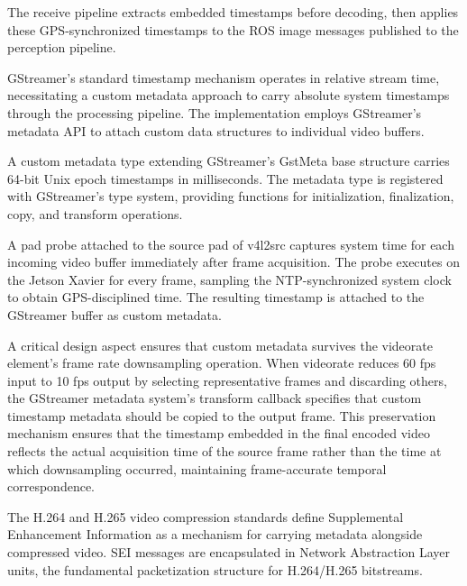 \documentclass{erauthesis}
\begin{document}
The receive pipeline extracts embedded timestamps before decoding, then applies these GPS-synchronized timestamps to the ROS image messages published to the perception pipeline.


GStreamer's standard timestamp mechanism operates in relative stream time, necessitating a custom metadata approach to carry absolute system timestamps through the processing pipeline.
The implementation employs GStreamer's metadata API to attach custom data structures to individual video buffers.

A custom metadata type extending GStreamer's GstMeta base structure carries 64-bit Unix epoch timestamps in milliseconds.
The metadata type is registered with GStreamer's type system, providing functions for initialization, finalization, copy, and transform operations.


A pad probe attached to the source pad of v4l2src captures system time for each incoming video buffer immediately after frame acquisition.
The probe executes on the Jetson Xavier for every frame, sampling the NTP-synchronized system clock to obtain GPS-disciplined time.
The resulting timestamp is attached to the GStreamer buffer as custom metadata.


A critical design aspect ensures that custom metadata survives the videorate element's frame rate downsampling operation.
When videorate reduces 60 fps input to 10 fps output by selecting representative frames and discarding others, the GStreamer metadata system's transform callback specifies that custom timestamp metadata should be copied to the output frame.
This preservation mechanism ensures that the timestamp embedded in the final encoded video reflects the actual acquisition time of the source frame rather than the time at which downsampling occurred, maintaining frame-accurate temporal correspondence.


The H.264 and H.265 video compression standards define Supplemental Enhancement Information as a mechanism for carrying metadata alongside compressed video.
SEI messages are encapsulated in Network Abstraction Layer units, the fundamental packetization structure for H.264/H.265 bitstreams.
\end{document}
